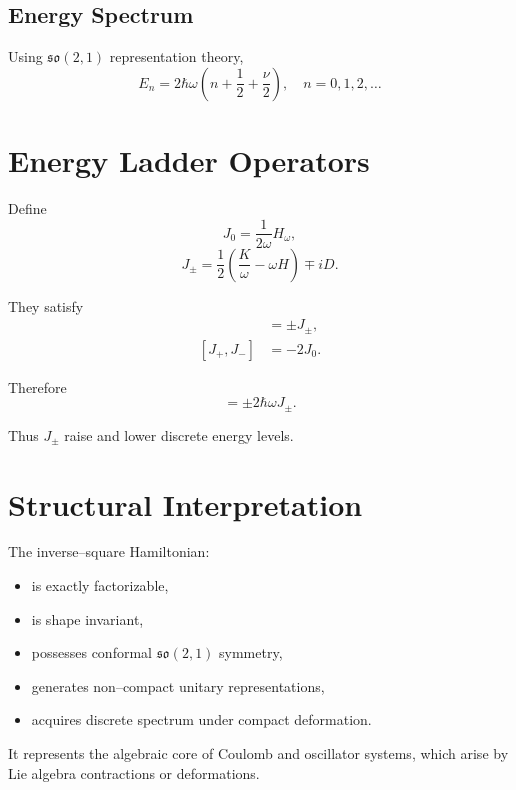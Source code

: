 \documentclass[11pt,a4paper]{article}
\begin{document}
\subsection*{Energy Spectrum}

Using $\mathfrak{so}(2,1)$ representation theory,
\begin{equation}
E_n
=
2\hbar\omega
\left(
n+\frac12+\frac{\nu}{2}
\right),
\quad
n=0,1,2,\dots
\end{equation}

\section{Energy Ladder Operators}

Define
\begin{equation}
J_0 = \frac{1}{2\omega}H_\omega,
\end{equation}
\begin{equation}
J_\pm
=
\frac12\left(\frac{K}{\omega}-\omega H\right)
\mp i D.
\end{equation}

They satisfy
\begin{align}
[J_0,J_\pm] &= \pm J_\pm,\\
[J_+,J_-] &= -2J_0.
\end{align}

Therefore
\begin{equation}
[H_\omega,J_\pm]=\pm 2\hbar\omega J_\pm.
\end{equation}

Thus $J_\pm$ raise and lower discrete energy levels.

\section{Structural Interpretation}

The inverse–square Hamiltonian:

\begin{itemize}
\item is exactly factorizable,
\item is shape invariant,
\item possesses conformal $\mathfrak{so}(2,1)$ symmetry,
\item generates non–compact unitary representations,
\item acquires discrete spectrum under compact deformation.
\end{itemize}

It represents the algebraic core of Coulomb and oscillator systems,
which arise by Lie algebra contractions or deformations.
\end{document}
